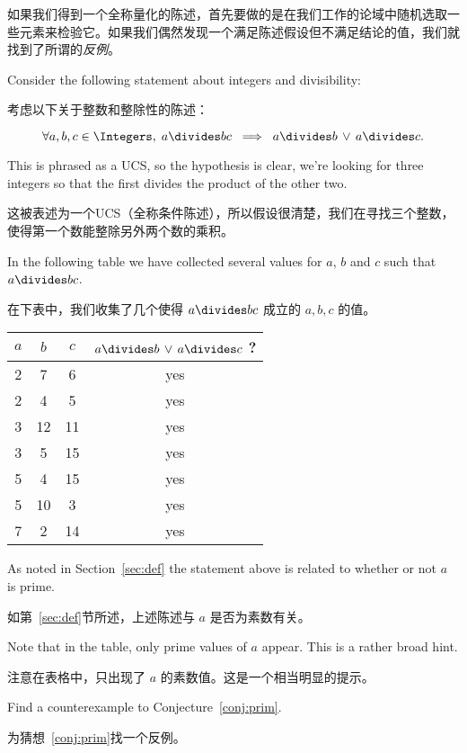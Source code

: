 如果我们得到一个全称量化的陈述，首先要做的是在我们工作的论域中随机选取一些元素来检验它。如果我们偶然发现一个满足陈述假设但不满足结论的值，我们就找到了所谓的\emph{反例}。

Consider the following statement about integers and divisibility:

考虑以下关于整数和整除性的陈述：

\begin{conj} \label{conj:prim}
\[ \forall a,b,c \in \Integers, \; a \divides bc \; \implies \; a \divides b \,
\lor \, a \divides c. \]
\end{conj}

This is phrased as a UCS, so the hypothesis is clear, we're looking 
for three integers so that the first divides the product of the other
two.

这被表述为一个UCS（全称条件陈述），所以假设很清楚，我们在寻找三个整数，使得第一个数能整除另外两个数的乘积。

In the following table we have collected several values for
$a$, $b$ and $c$ such that $a \divides bc$.

在下表中，我们收集了几个使得 $a \divides bc$ 成立的 $a, b, c$ 的值。
\begin{center}
\begin{tabular}{c|c|c|c}
$a$ & $b$ & $c$ & $ a \divides b \, \lor \, a \divides c $ ? \\ \hline
2 & 7 & 6 & yes \\  
2 & 4 & 5 & yes \\  
3 & 12 & 11 & yes \\
3 & 5 & 15 & yes \\
5 & 4 & 15 & yes \\
5 & 10 & 3 & yes \\
7 & 2 & 14 & yes \\
\end{tabular}
\end{center}

\begin{exer} 
As noted in Section~\ref{sec:def} the statement above is related to
whether or not $a$ is prime.

如第~\ref{sec:def}节所述，上述陈述与 $a$ 是否为素数有关。

Note that in the table, only prime
values of $a$ appear.  This is a rather broad hint.

注意在表格中，只出现了 $a$ 的素数值。这是一个相当明显的提示。

Find a 
counterexample to Conjecture~\ref{conj:prim}.

为猜想~\ref{conj:prim}找一个反例。
\end{exer}

